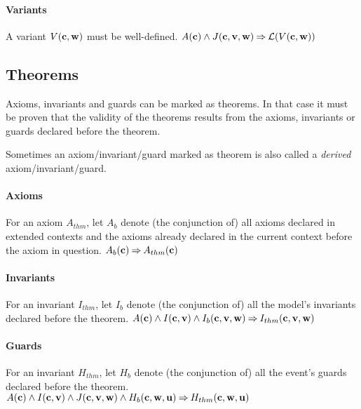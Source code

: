 \paragraph{Variants}
\label{well_definedness_of_variants}
A variant $V(\mathbf{c},\mathbf{w})$ must be well-defined.
%
  {$A(\mathbf{c}) \land J(\mathbf{c},\mathbf{v},\mathbf{w}) \mathbin\Rightarrow \mathcal{L}(V(\mathbf{c},\mathbf{w}))$}


\subsection{Theorems}
\label{theorems}
Axioms, invariants and guards can be marked as theorems. In that case it must be proven that
  the validity of the theorems results from the axioms, invariants or guards declared before
  the theorem.

Sometimes an axiom/invariant/guard marked as theorem is also called a \emph{derived} axiom/invariant/guard.

\paragraph{Axioms}
\label{axioms_as_theorems}
For an axiom $A_{thm}$, 
  let $A_b$ denote (the conjunction of) all axioms declared
  in extended contexts and the axioms already declared in
  the current context before the axiom in question.
%
  {$A_b(\mathbf{c}) \mathbin\Rightarrow A_{thm}(\mathbf{c})$}

\paragraph{Invariants}
\label{invariants_as_theorems}
For an invariant $I_{thm}$, 
  let $I_b$ denote (the conjunction of) all the model's 
  invariants declared before the theorem.
%
  {$A(\mathbf{c}) \land I(\mathbf{c},\mathbf{v}) \land I_b(\mathbf{c},\mathbf{v},\mathbf{w})
    \mathbin\Rightarrow I_{thm}(\mathbf{c},\mathbf{v},\mathbf{w})$}

\paragraph{Guards}
\label{guards_as_theorems}
For an invariant $H_{thm}$, 
  let $H_b$ denote (the conjunction of) all the event's 
  guards declared before the theorem.
%
  {$A(\mathbf{c}) \land I(\mathbf{c},\mathbf{v}) \land J(\mathbf{c},\mathbf{v},\mathbf{w}) \land
    H_b(\mathbf{c},\mathbf{w},\mathbf{u}) 
    \mathbin\Rightarrow H_{thm}(\mathbf{c},\mathbf{w},\mathbf{u})$}


